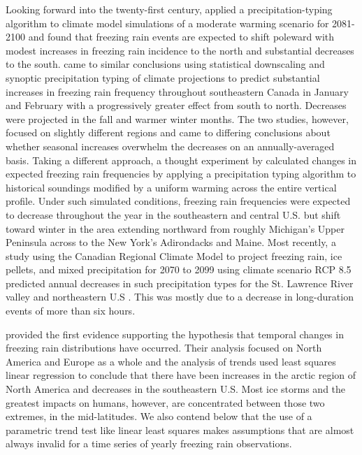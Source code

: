 \documentclass[twocol]{ametsoc}
\begin{document}
Looking forward into the twenty-first century, \citet{lambert2011simulated} applied a precipitation-typing algorithm to climate model simulations of a moderate warming scenario for 2081-2100 and found that freezing rain events are expected to shift poleward with modest increases in freezing rain incidence to the north and substantial decreases to the south. \citet{cheng2011possible} came to similar conclusions using statistical downscaling and synoptic precipitation typing of climate projections to predict substantial increases in freezing rain frequency throughout southeastern Canada in January and February with a progressively greater effect from south to north. Decreases were projected in the fall and warmer winter months. The two studies, however, focused on slightly different regions and came to differing conclusions about whether seasonal increases overwhelm the decreases on an annually-averaged basis. Taking a different approach, a thought experiment by \citet{klima2015ice} calculated changes in expected freezing rain frequencies by applying a precipitation typing algorithm to historical soundings modified by a uniform warming across the entire vertical profile. Under such simulated conditions, freezing rain frequencies were expected to decrease throughout the year in the southeastern and central U.S. but shift toward winter in the area extending northward from roughly Michigan's Upper Peninsula across to the New York's Adirondacks and Maine. Most recently, a study using the Canadian Regional Climate Model to project freezing rain, ice pellets, and mixed precipitation for 2070 to 2099 using climate scenario RCP 8.5 predicted annual decreases in such precipitation types for the St. Lawrence River valley and northeastern U.S \citep{matte2018mixed}. This was mostly due to a decrease in long-duration events of more than six hours. 

\citet{groisman2016recent} provided the first evidence supporting the hypothesis that temporal changes in freezing rain distributions have occurred. Their analysis focused on North America and Europe as a whole and the analysis of trends used least squares linear regression to conclude that there have been increases in the arctic region of North America and decreases in the southeastern U.S.  Most ice storms and the greatest impacts on humans, however, are concentrated between those two extremes, in the mid-latitudes. We also contend below that the use of a parametric trend test like linear least squares makes assumptions that are almost always invalid for a time series of yearly freezing rain observations.
\end{document}

